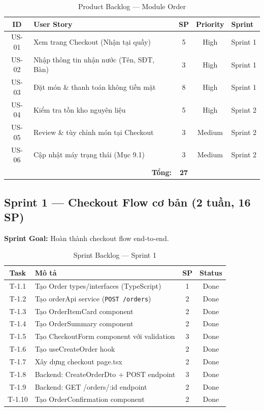 \documentclass[12pt,a4paper]{article}
\begin{document}
\begin{table}[H]
\centering
\caption{Product Backlog — Module Order}
\begin{tabular}{clccl}
\toprule
\textbf{ID} & \textbf{User Story} & \textbf{SP} & \textbf{Priority} & \textbf{Sprint} \\
\midrule
US-01 & Xem trang Checkout (Nhận tại quầy)       & 5 & High   & Sprint 1 \\
US-02 & Nhập thông tin nhận nước (Tên, SĐT, Bàn)  & 3 & High   & Sprint 1 \\
US-03 & Đặt món \& thanh toán không tiền mặt      & 8 & High   & Sprint 1 \\
US-04 & Kiểm tra tồn kho nguyên liệu              & 5 & High   & Sprint 2 \\
US-05 & Review \& tùy chỉnh món tại Checkout     & 3 & Medium & Sprint 2 \\
US-06 & Cập nhật máy trạng thái (Mục 9.1)         & 3 & Medium & Sprint 2 \\
\midrule
\multicolumn{2}{r}{\textbf{Tổng:}} & \textbf{27} & & \\
\bottomrule
\end{tabular}
\end{table}

\subsection{Sprint 1 — Checkout Flow cơ bản (2 tuần, 16 SP)}

\textbf{Sprint Goal:} Hoàn thành checkout flow end-to-end.

\begin{table}[H]
\centering
\caption{Sprint Backlog — Sprint 1}
\small
\begin{tabularx}{\textwidth}{cXcc}
\toprule
\textbf{Task} & \textbf{Mô tả} & \textbf{SP} & \textbf{Status} \\
\midrule
T-1.1 & Tạo Order types/interfaces (TypeScript) & 1 & Done \\
T-1.2 & Tạo orderApi service (\texttt{POST /orders}) & 2 & Done \\
T-1.3 & Tạo OrderItemCard component & 2 & Done \\
T-1.4 & Tạo OrderSummary component & 2 & Done \\
T-1.5 & Tạo CheckoutForm component với validation & 3 & Done \\
T-1.6 & Tạo useCreateOrder hook & 2 & Done \\
T-1.7 & Xây dựng checkout page.tsx & 2 & Done \\
T-1.8 & Backend: CreateOrderDto + POST endpoint & 3 & Done \\
T-1.9 & Backend: GET /orders/:id endpoint & 2 & Done \\
T-1.10 & Tạo OrderConfirmation component & 2 & Done \\
\bottomrule
\end{tabularx}
\end{table}
\end{document}
